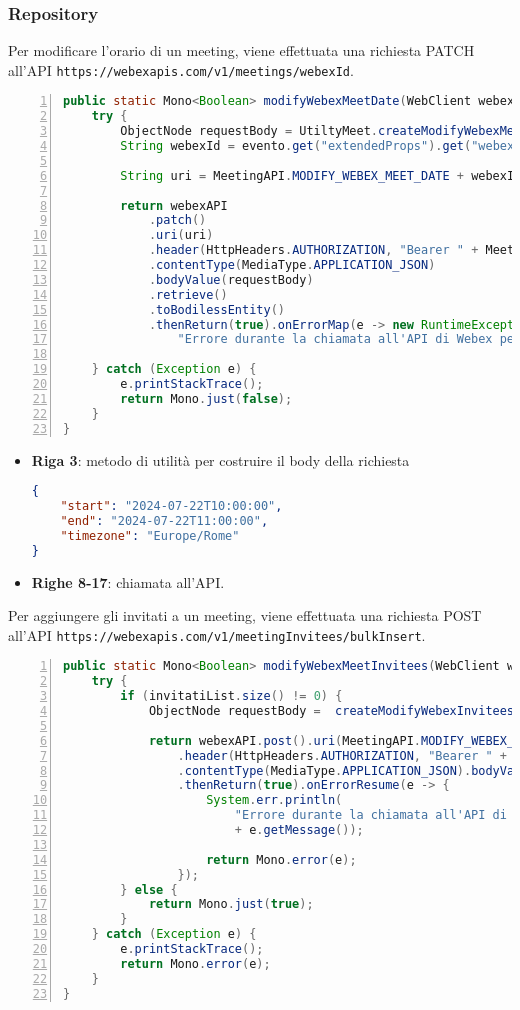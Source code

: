 \subsubsection{Repository}
Per modificare l'orario di un meeting, viene effettuata una richiesta PATCH 
all'API \texttt{https://webexapis.com/v1/meetings/webexId}.
\begin{lstlisting}[language=java, frame=lines, basicstyle=\ttfamily\scriptsize, numbers=left]
public static Mono<Boolean> modifyWebexMeetDate(WebClient webexAPI, JsonNode evento) {
	try {
		ObjectNode requestBody = UtiltyMeet.createModifyWebexMeetDateBody(evento);
		String webexId = evento.get("extendedProps").get("webexId").asText();

		String uri = MeetingAPI.MODIFY_WEBEX_MEET_DATE + webexId;

		return webexAPI
			.patch()
			.uri(uri)
			.header(HttpHeaders.AUTHORIZATION, "Bearer " + MeetingAPI.TOKEN)
			.contentType(MediaType.APPLICATION_JSON)
			.bodyValue(requestBody)
			.retrieve()
			.toBodilessEntity()
			.thenReturn(true).onErrorMap(e -> new RuntimeException(
				"Errore durante la chiamata all'API di Webex per la modifica di un evento", e));

	} catch (Exception e) {
		e.printStackTrace();
		return Mono.just(false);
	}
}
\end{lstlisting}
\begin{itemize}
    \item \textbf{Riga 3}: metodo di utilità per costruire il body della richiesta
        \begin{lstlisting}[language=json,firstnumber=1]
{
    "start": "2024-07-22T10:00:00",
    "end": "2024-07-22T11:00:00",
    "timezone": "Europe/Rome"
}
        \end{lstlisting}
    
    \item \textbf{Righe 8-17}: chiamata all'API.
\end{itemize}
Per aggiungere gli invitati a un meeting, viene effettuata una richiesta POST 
all'API \texttt{https://webexapis.com/v1/meetingInvitees/bulkInsert}.
\begin{lstlisting}[language=java, frame=lines, basicstyle=\ttfamily\scriptsize, numbers=left]
public static Mono<Boolean> modifyWebexMeetInvitees(WebClient webexAPI, JsonNode evento, List<String> invitatiList) {
	try {		
		if (invitatiList.size() != 0) {		
			ObjectNode requestBody =  createModifyWebexInviteesBody(evento, invitatiList);

			return webexAPI.post().uri(MeetingAPI.MODIFY_WEBEX_MEET_INVITEES)
				.header(HttpHeaders.AUTHORIZATION, "Bearer " + MeetingAPI.TOKEN)
				.contentType(MediaType.APPLICATION_JSON).bodyValue(requestBody).retrieve().toBodilessEntity()
				.thenReturn(true).onErrorResume(e -> {
					System.err.println(
						"Errore durante la chiamata all'API di Webex per l'aggiunta degli invitati a un meet: "
						+ e.getMessage());

				    return Mono.error(e);
				});
		} else {
			return Mono.just(true);
		}
	} catch (Exception e) {
		e.printStackTrace();
		return Mono.error(e);
	}
}
\end{lstlisting}
